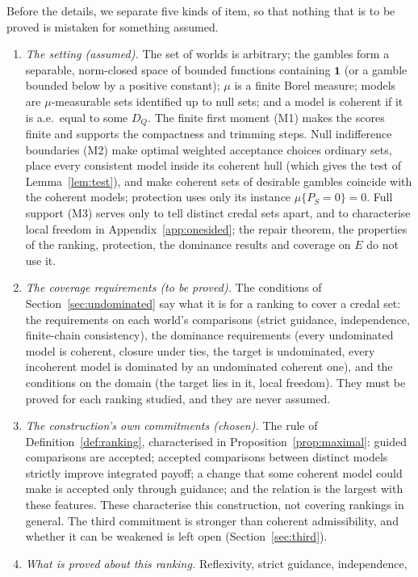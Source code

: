\documentclass[11pt]{article}
\newcommand{\one}{\mathbf{1}}
\theoremstyle{plain}
\theoremstyle{definition}
\theoremstyle{remark}
\begin{document}
Before the details, we separate five kinds of item, so that nothing that is to be proved is
mistaken for something assumed.
\begin{enumerate}[label=(\Alph*)]
  \item \emph{The setting (assumed).} The set of worlds is arbitrary; the gambles form a
  separable, norm-closed space of bounded functions containing $\one$ (or a gamble bounded below
  by a positive constant); $\mu$ is a finite Borel measure; models are $\mu$-measurable sets
  identified up to null sets; and a model is coherent if it is a.e.\ equal to some $D_Q$. The
  finite first moment (M1) makes the scores finite and supports the compactness and trimming
  steps. Null indifference boundaries (M2) make optimal weighted acceptance choices ordinary
  sets, place every consistent model inside its coherent hull (which gives the test of
  Lemma~\ref{lem:test}), and make coherent sets of desirable gambles coincide with the coherent
  models; protection uses only its instance $\mu\{P_S=0\}=0$. Full support (M3) serves only to
  tell distinct credal sets apart, and to characterise local freedom in
  Appendix~\ref{app:onesided}; the repair theorem, the properties of the ranking, protection, the dominance results and coverage on $E$ do not use it.
  \item \emph{The coverage requirements (to be proved).} The conditions of
  Section~\ref{sec:undominated} say what it is for a ranking to cover a credal set: the
  requirements on each world's comparisons (strict guidance, independence, finite-chain
  consistency), the dominance requirements (every undominated model is coherent, closure under
  ties, the target is undominated, every incoherent model is dominated by an undominated
  coherent one), and the conditions on the domain (the target lies in it, local freedom). They
  must be proved for each ranking studied, and they are never assumed.
  \item \emph{The construction's own commitments (chosen).} The rule of
  Definition~\ref{def:ranking}, characterised in Proposition~\ref{prop:maximal}: guided
  comparisons are accepted; accepted comparisons between distinct models strictly improve
  integrated payoff; a change that some coherent model could make is accepted only through
  guidance; and the relation is the largest with these features. These characterise this
  construction, not covering rankings in general. The third commitment is stronger than
  coherent admissibility, and whether it can be weakened is left open
  (Section~\ref{sec:third}).
  \item \emph{What is proved about this ranking.} Reflexivity, strict guidance, independence,

\end{enumerate}
\end{document}
